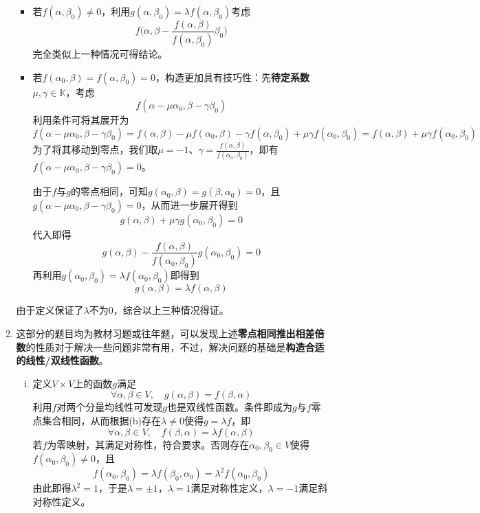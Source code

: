 \documentclass[a4paper,UTF8,fontset=windows,AutoFakeBold]{ctexart}
\newcommand*{\note}{\noindent *}
\begin{document}
\begin{enumerate}
\begin{enumerate}
\begin{itemize}
            \item 若$f(\alpha,\beta_0)\ne0$，利用$g(\alpha,\beta_0)=\lambda f(\alpha,\beta_0)$考虑
            $$f\bigg(\alpha,\beta-\frac{f(\alpha,\beta)}{f(\alpha,\beta_0)}\beta_0\bigg)$$
            完全类似上一种情况可得结论。

            \item 若$f(\alpha_0,\beta)=f(\alpha,\beta_0)=0$，构造更加具有技巧性：先\textbf{待定系数}$\mu,\gamma\in\mathbb{K}$，考虑
            $$f(\alpha-\mu\alpha_0,\beta-\gamma\beta_0)$$
            利用条件可将其展开为
            $$f(\alpha-\mu\alpha_0,\beta-\gamma\beta_0)=f(\alpha,\beta)-\mu f(\alpha_0,\beta)-\gamma f(\alpha,\beta_0)+\mu\gamma f(\alpha_0,\beta_0)=f(\alpha,\beta)+\mu\gamma f(\alpha_0,\beta_0)$$
            为了将其移动到零点，我们取$\mu=-1$、$\gamma=\frac{f(\alpha,\beta)}{f(\alpha_0,\beta_0)}$，即有$f(\alpha-\mu\alpha_0,\beta-\gamma\beta_0)=0$。

            由于$f$与$g$的零点相同，可知$g(\alpha_0,\beta)=g(\beta,\alpha_0)=0$，且$g(\alpha-\mu\alpha_0,\beta-\gamma\beta_0)=0$，从而进一步展开得到
            $$g(\alpha,\beta)+\mu\gamma g(\alpha_0,\beta_0)=0$$
            代入即得
            $$g(\alpha,\beta)-\frac{f(\alpha,\beta)}{f(\alpha_0,\beta_0)}g(\alpha_0,\beta_0)=0$$
            再利用$g(\alpha_0,\beta_0)=\lambda f(\alpha_0,\beta_0)$即得到
            $$g(\alpha,\beta)=\lambda f(\alpha,\beta)$$
        \end{itemize}
        由于定义保证了$\lambda$不为0，综合以上三种情况得证。

        \item
        \note 这部分的题目均为教材习题或往年题，可以发现上述\textbf{零点相同推出相差倍数}的性质对于解决一些问题非常有用，不过，解决问题的基础是\textbf{构造合适的线性/双线性函数}。
        \begin{enumerate}[(i)]
            \item 定义$V\times V$上的函数$g$满足
            $$\forall\alpha,\beta\in V,\quad g(\alpha,\beta)=f(\beta,\alpha)$$
            利用$f$对两个分量均线性可发现$g$也是双线性函数。条件即成为$g$与$f$零点集合相同，从而根据(b)存在$\lambda\ne0$使得$g=\lambda f$，即
            $$\forall\alpha,\beta\in V,\quad f(\beta,\alpha)=\lambda f(\alpha,\beta)$$
            若$f$为零映射，其满足对称性，符合要求。否则存在$\alpha_0,\beta_0\in V$使得$f(\alpha_0,\beta_0)\ne 0$，且
            $$f(\alpha_0,\beta_0)=\lambda f(\beta_0,\alpha_0)=\lambda^2f(\alpha_0,\beta_0)$$
            由此即得$\lambda^2=1$，于是$\lambda=\pm1$，$\lambda=1$满足对称性定义，$\lambda=-1$满足斜对称性定义。


\end{enumerate}
\end{enumerate}
\end{enumerate}
\end{document}
